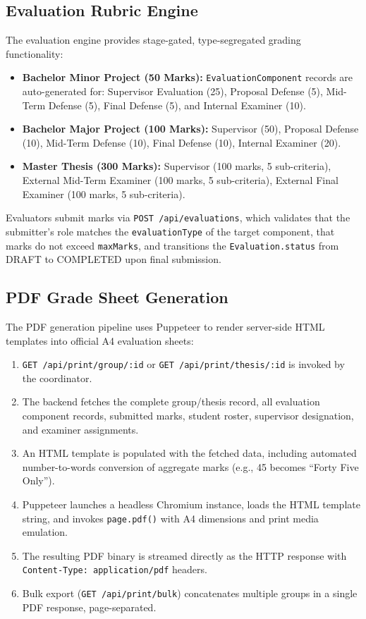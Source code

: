 \subsection{Evaluation Rubric Engine}
The evaluation engine provides stage-gated, type-segregated grading functionality:
\begin{itemize}
    \item \textbf{Bachelor Minor Project (50 Marks):} \texttt{EvaluationComponent} records are auto-generated for: Supervisor Evaluation (25), Proposal Defense (5), Mid-Term Defense (5), Final Defense (5), and Internal Examiner (10).
    \item \textbf{Bachelor Major Project (100 Marks):} Supervisor (50), Proposal Defense (10), Mid-Term Defense (10), Final Defense (10), Internal Examiner (20).
    \item \textbf{Master Thesis (300 Marks):} Supervisor (100 marks, 5 sub-criteria), External Mid-Term Examiner (100 marks, 5 sub-criteria), External Final Examiner (100 marks, 5 sub-criteria).
\end{itemize}
Evaluators submit marks via \texttt{POST /api/evaluations}, which validates that the submitter's role matches the \texttt{evaluationType} of the target component, that marks do not exceed \texttt{maxMarks}, and transitions the \texttt{Evaluation.status} from DRAFT to COMPLETED upon final submission.

\subsection{PDF Grade Sheet Generation}
The PDF generation pipeline uses Puppeteer to render server-side HTML templates into official A4 evaluation sheets:
\begin{enumerate}
    \item \texttt{GET /api/print/group/:id} or \texttt{GET /api/print/thesis/:id} is invoked by the coordinator.
    \item The backend fetches the complete group/thesis record, all evaluation component records, submitted marks, student roster, supervisor designation, and examiner assignments.
    \item An HTML template is populated with the fetched data, including automated number-to-words conversion of aggregate marks (e.g., 45 becomes ``Forty Five Only'').
    \item Puppeteer launches a headless Chromium instance, loads the HTML template string, and invokes \texttt{page.pdf()} with A4 dimensions and print media emulation.
    \item The resulting PDF binary is streamed directly as the HTTP response with \texttt{Content-Type: application/pdf} headers.
    \item Bulk export (\texttt{GET /api/print/bulk}) concatenates multiple groups in a single PDF response, page-separated.
\end{enumerate}


